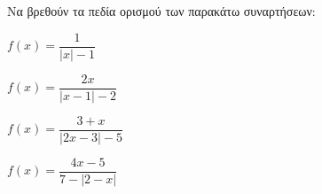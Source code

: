 Να βρεθούν τα πεδία ορισμού των παρακάτω συναρτήσεων:
\begin{alist}
\item $ f(x)=\dfrac{1}{|x|-1} $
\item $ f(x)=\dfrac{2x}{|x-1|-2} $
\item $ f(x)=\dfrac{3+x}{|2x-3|-5} $
\item $ f(x)=\dfrac{4x-5}{7-|2-x|} $
\end{alist}
